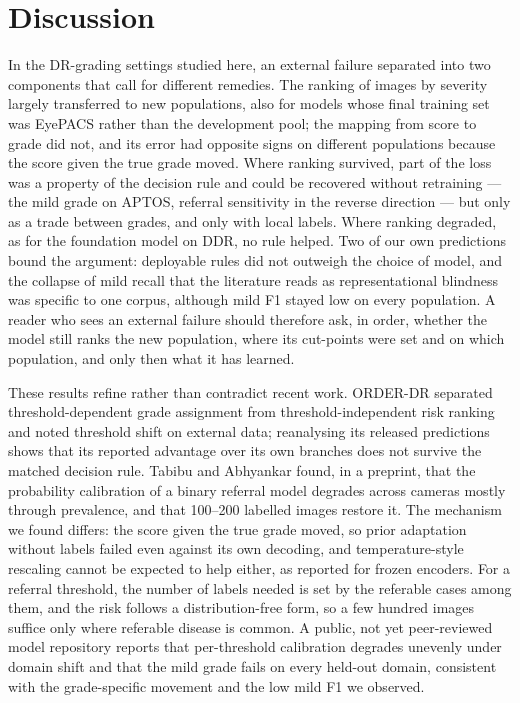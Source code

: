\section{Discussion}\label{sec:discussion}

In the DR-grading settings studied here, an external failure separated into two components that
call for different remedies. The ranking of images by severity largely transferred to new
populations, also for models whose final training set was EyePACS rather than the development
pool; the mapping from score to grade did not, and its error had opposite signs on different
populations because the score given the true grade moved. Where ranking survived, part of the loss was a property of the decision rule and
could be recovered without retraining --- the mild grade on APTOS, referral sensitivity in the
reverse direction --- but only as a trade between grades, and only with local labels. Where ranking
degraded, as for the foundation model on DDR, no rule helped. Two of our own predictions bound the
argument: deployable rules did not outweigh the choice of model, and the collapse of mild recall
that the literature reads as representational blindness was specific to one corpus, although mild
F1 stayed low on every population. A reader who sees
an external failure should therefore ask, in order, whether the model still ranks the new
population, where its cut-points were set and on which population, and only then what it has
learned.

These results refine rather than contradict recent work. ORDER-DR separated threshold-dependent
grade assignment from threshold-independent risk ranking and noted threshold shift on external
data\cite{sheng2026orderdr}; reanalysing its released predictions shows that its reported
advantage over its own branches does not survive the matched decision rule. Tabibu and Abhyankar
found, in a preprint, that the probability calibration of a binary referral model degrades
across cameras mostly through prevalence, and that 100--200 labelled images restore
it\cite{tabibu2026discrimination}. The mechanism we found differs: the score given the true grade
moved, so prior adaptation without labels failed even against its own decoding, and
temperature-style rescaling cannot be expected to help either, as reported for frozen
encoders\cite{poyrazer2026calibration}. For a referral threshold, the number of labels needed is
set by the referable cases among them, and the risk follows a distribution-free form, so a few
hundred images suffice only where referable disease is common. A public, not yet peer-reviewed
model repository reports that per-threshold calibration degrades unevenly under domain shift and
that the mild grade fails on every held-out domain\cite{gradeye2026}, consistent with the
grade-specific movement and the low mild F1 we observed.

